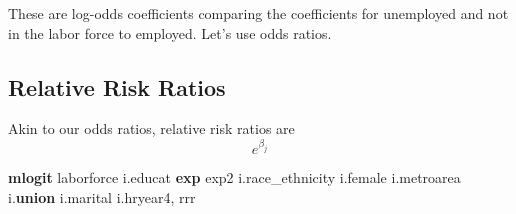 \documentclass[
]{book}
\newenvironment{Shaded}{\begin{snugshade}}{\end{snugshade}}
\newcommand{\FunctionTok}[1]{\textcolor[rgb]{0.13,0.29,0.53}{\textbf{#1}}}
\newcommand{\KeywordTok}[1]{\textcolor[rgb]{0.13,0.29,0.53}{\textbf{#1}}}
\newcommand{\NormalTok}[1]{#1}
\begin{document}
These are log-odds coefficients comparing the coefficients for unemployed and not in the labor force to employed. Let's use odds ratios.

\subsection{Relative Risk Ratios}\label{relative-risk-ratios}

Akin to our odds ratios, relative risk ratios are \[ e^{\beta_j} \]

\begin{Shaded}
\begin{Highlighting}[]
\KeywordTok{mlogit}\NormalTok{ laborforce i.educat }\FunctionTok{exp}\NormalTok{ exp2 i.race\_ethnicity i.female i.metroarea i.}\KeywordTok{union}\NormalTok{ i.marital i.hryear4, rrr}
\end{Highlighting}
\end{Shaded}
\end{document}
